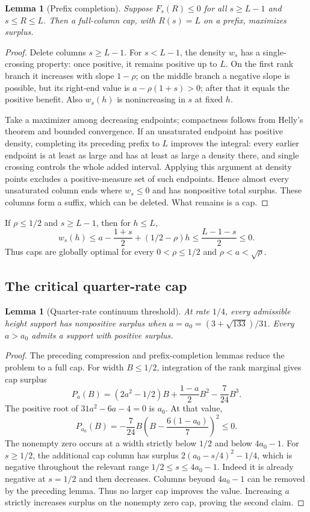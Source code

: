 \documentclass[11pt]{article}
\newtheorem{lemma}[theorem]{Lemma}
\theoremstyle{remark}\newtheorem{remark}[theorem]{Remark}
\begin{document}
\begin{lemma}[Prefix completion]\label{lem:completion}
Suppose $F_s(R)\le0$ for all $s\ge L-1$ and $s\le R\le L$. Then a full-column cap, with $R(s)=L$ on a prefix, maximizes surplus.
\end{lemma}
\begin{proof}
Delete columns $s\ge L-1$. For $s<L-1$, the density $w_s$ has a single-crossing property: once positive, it remains positive up to $L$. On the first rank branch it increases with slope $1-\rho$; on the middle branch a negative slope is possible, but its right-end value is $a-\rho(1+s)>0$; after that it equals the positive benefit. Also $w_s(h)$ is nonincreasing in $s$ at fixed $h$.

Take a maximizer among decreasing endpoints; compactness follows from Helly's theorem and bounded convergence. If an unsaturated endpoint has positive density, completing its preceding prefix to $L$ improves the integral: every earlier endpoint is at least as large and has at least as large a density there, and single crossing controls the whole added interval. Applying this argument at density points excludes a positive-measure set of such endpoints. Hence almost every unsaturated column ends where $w_s\le0$ and has nonpositive total surplus. These columns form a suffix, which can be deleted. What remains is a cap.
\end{proof}

If $\rho\le1/2$ and $s\ge L-1$, then for $h\le L$,
\[
 w_s(h)\le a-\frac{1+s}{2}+(1/2-\rho)h
 \le\frac{L-1-s}{2}\le0.
\]
Thus caps are globally optimal for every $0<\rho\le1/2$ and $\rho<a<\sqrt\rho$.


\subsection{The critical quarter-rate cap}

\begin{lemma}[Quarter-rate continuum threshold]\label{thm:curve}
At rate $1/4$, every admissible height support has nonpositive surplus
when $a=a_0=(3+\sqrt{133})/31$. Every $a>a_0$ admits a support with
positive surplus.
\end{lemma}
\begin{proof}
The preceding compression and prefix-completion lemmas reduce the
problem to a full cap. For width $B\le1/2$, integration of the rank
marginal gives cap surplus
\[
 P_a(B)=(2a^2-1/2)B+\frac{1-a}{2}B^2-\frac7{24}B^3.
\]
The positive root of $31a^2-6a-4=0$ is $a_0$. At that value,
\[
 P_{a_0}(B)=-\frac7{24}B
       \left(B-\frac{6(1-a_0)}7\right)^2\le0.
\]
The nonempty zero occurs at a width strictly below $1/2$ and below
$4a_0-1$. For $s\ge1/2$, the additional cap column has surplus
$2(a_0-s/4)^2-1/4$, which is negative throughout the relevant range
$1/2\le s\le4a_0-1$. Indeed it is already negative at $s=1/2$ and
then decreases. Columns beyond $4a_0-1$ can be removed by the preceding
lemma. Thus no larger cap improves the value. Increasing $a$ strictly
increases surplus on the nonempty zero cap, proving the second claim.
\end{proof}
\end{document}
